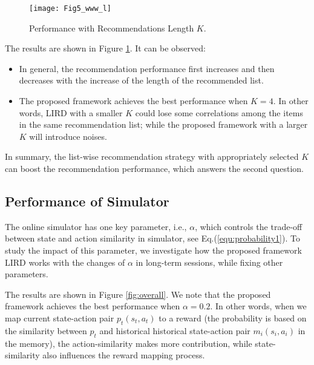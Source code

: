 \begin{figure}[t]
	\centering
	\texttt{[image: Fig5\_www\_l]}
	\caption{Performance with Recommendations Length $K$.}
	\label{fig:architecture}
\end{figure}

The results are shown in Figure \ref{fig:architecture}. It can be observed: 

\begin{itemize}[leftmargin=*]
\item In general, the recommendation performance first increases and then decreases with the increase of the length of the recommended list. 
\item The proposed framework achieves the best performance when $K = 4$. In other words, LIRD with a smaller $K$ could lose some correlations among the items in the same recommendation list; while the proposed framework with a larger $K$ will introduce noises. 
\end{itemize}

In summary, the list-wise recommendation strategy with appropriately selected $K$ can boost the recommendation performance, which answers the second question. 

\subsection{Performance of Simulator}
\label{sec:parametric}

The online simulator has one key parameter, i.e., $\alpha$, which controls the trade-off between state and action similarity in simulator, see Eq.(\ref{equ:probability1}). To study the impact of this parameter, we investigate how the proposed framework LIRD works with the changes of $\alpha$ in long-term sessions, while fixing other parameters.


The results are shown in Figure \ref{fig:overall}. We note that the proposed framework achieves the best performance when $\alpha = 0.2$. In other words, when we map current state-action pair $p_t (s_t, a_t)$ to a reward (the probability is based on the similarity between $p_t$ and historical historical state-action pair $m_i(s_i, a_i)$ in the memory), the action-similarity makes more contribution, while state-similarity also influences the reward mapping process.

